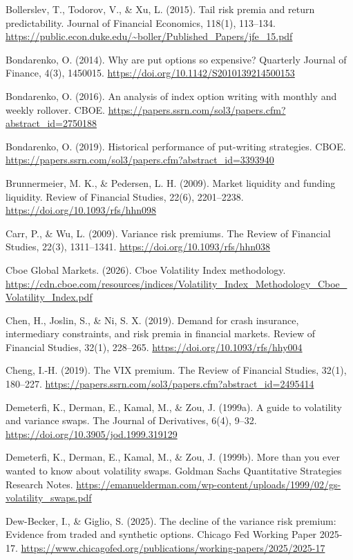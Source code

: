 \documentclass[11pt,a4paper]{article}
\begin{document}
\begin{fshfreferences}
\item Bollerslev, T., Todorov, V., \& Xu, L. (2015). Tail risk premia and return predictability. Journal of Financial Economics, 118(1), 113--134. \url{https://public.econ.duke.edu/~boller/Published_Papers/jfe_15.pdf}
\item Bondarenko, O. (2014). Why are put options so expensive? Quarterly Journal of Finance, 4(3), 1450015. \url{https://doi.org/10.1142/S2010139214500153}
\item Bondarenko, O. (2016). An analysis of index option writing with monthly and weekly rollover. CBOE. \url{https://papers.ssrn.com/sol3/papers.cfm?abstract_id=2750188}
\item Bondarenko, O. (2019). Historical performance of put-writing strategies. CBOE. \url{https://papers.ssrn.com/sol3/papers.cfm?abstract_id=3393940}
\item Brunnermeier, M. K., \& Pedersen, L. H. (2009). Market liquidity and funding liquidity. Review of Financial Studies, 22(6), 2201--2238. \url{https://doi.org/10.1093/rfs/hhn098}
\item Carr, P., \& Wu, L. (2009). Variance risk premiums. The Review of Financial Studies, 22(3), 1311--1341. \url{https://doi.org/10.1093/rfs/hhn038}
\item Cboe Global Markets. (2026). Cboe Volatility Index methodology. \url{https://cdn.cboe.com/resources/indices/Volatility_Index_Methodology_Cboe_Volatility_Index.pdf}
\item Chen, H., Joslin, S., \& Ni, S. X. (2019). Demand for crash insurance, intermediary constraints, and risk premia in financial markets. Review of Financial Studies, 32(1), 228--265. \url{https://doi.org/10.1093/rfs/hhy004}
\item Cheng, I.-H. (2019). The VIX premium. The Review of Financial Studies, 32(1), 180--227. \url{https://papers.ssrn.com/sol3/papers.cfm?abstract_id=2495414}
\item Demeterfi, K., Derman, E., Kamal, M., \& Zou, J. (1999a). A guide to volatility and variance swaps. The Journal of Derivatives, 6(4), 9--32. \url{https://doi.org/10.3905/jod.1999.319129}
\item Demeterfi, K., Derman, E., Kamal, M., \& Zou, J. (1999b). More than you ever wanted to know about volatility swaps. Goldman Sachs Quantitative Strategies Research Notes. \url{https://emanuelderman.com/wp-content/uploads/1999/02/gs-volatility_swaps.pdf}
\item Dew-Becker, I., \& Giglio, S. (2025). The decline of the variance risk premium: Evidence from traded and synthetic options. Chicago Fed Working Paper 2025-17. \url{https://www.chicagofed.org/publications/working-papers/2025/2025-17}

\end{fshfreferences}
\end{document}
